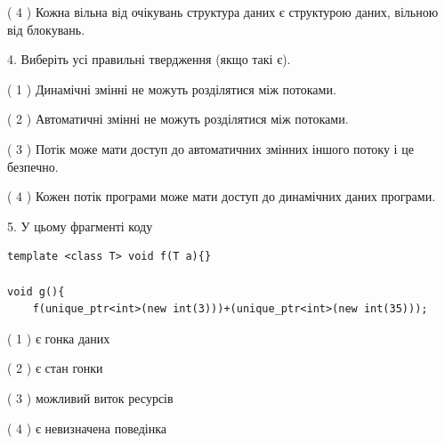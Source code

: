 \documentclass[12pt, ukrainian]{article}
\begin{document}
\begin {large}
{( 4 ) Кожна вільна від очікувань структура даних є структурою даних, вільною від блокувань.%


4. Виберіть усі правильні твердження (якщо такі є).\par
\vspace{2mm}

( 1 ) Динамічні змінні не можуть розділятися між потоками.%

( 2 ) Автоматичні змінні не можуть розділятися між потоками.%

( 3 ) Потік може мати доступ до автоматичних змінних іншого потоку і це безпечно.%

( 4 ) Кожен потік програми може мати доступ до динамічних даних програми.%


5. У цьому фрагменті коду
\begin{verbatim}
template <class T> void f(T a){}

void g(){
    f(unique_ptr<int>(new int(3)))+(unique_ptr<int>(new int(35)));
\end{verbatim}

( 1 ) є гонка даних%

( 2 ) є стан гонки%

( 3 ) можливий виток ресурсів%

( 4 ) є невизначена поведінка%
}
\end {large}
\end{document}
